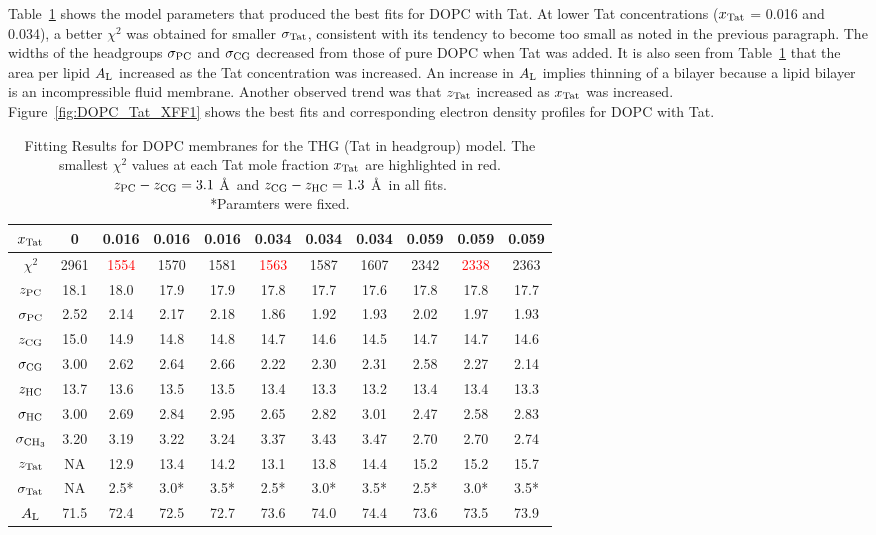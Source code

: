 Table~\ref{tab:DOPC_fit_results} shows the model parameters that produced
the best fits for DOPC with Tat.
At lower Tat concentrations ($x_\textrm{Tat}$ = 0.016 and 0.034), 
a better $\chi^2$ was obtained for smaller $\sigma_\textrm{Tat}$,
consistent with its tendency to become too small as noted 
in the previous paragraph. The widths of the headgroups $\sigma_\textrm{PC}$ and
$\sigma_\textrm{CG}$ decreased from those of pure DOPC when Tat was added.  
It is also seen from Table~\ref{tab:DOPC_fit_results} 
that the area per lipid $A_\textrm{L}$ increased as the Tat concentration was
increased. An increase in $A_\textrm{L}$ implies thinning of a bilayer because
a lipid bilayer is an incompressible fluid membrane. 
Another observed trend was that $z_\textrm{Tat}$ increased as $x_\textrm{Tat}$ was increased.
Figure~\ref{fig:DOPC_Tat_XFF1} shows the best fits and corresponding 
electron density profiles for DOPC with Tat.

\begin{table}[htbp]
  \centering
  \begin{tabular}{c|c|ccc|ccc|ccc}
    \hline
    $x_\textrm{Tat}$ & 0 & 0.016 & 0.016 & 0.016 & 0.034 & 0.034 & 0.034 & 0.059 & 0.059 & 0.059 \\
    \hline
    $\chi^2$ & 2961 & \textcolor{red}{1554} & 1570 & 1581 & \textcolor{red}{1563} & 1587 & 1607 & 2342 & \textcolor{red}{2338} & 2363 \\ 
    $z_\textrm{PC}$ & 18.1 & 18.0 & 17.9 & 17.9 & 17.8 & 17.7 & 17.6 & 17.8 & 17.8 & 17.7 \\
    $\sigma_\textrm{PC}$ & 2.52 & 2.14 & 2.17 & 2.18 & 1.86 & 1.92 & 1.93 & 2.02 & 1.97 & 1.93 \\
    $z_\textrm{CG}$ & 15.0 & 14.9 & 14.8 & 14.8 & 14.7 & 14.6 & 14.5 & 14.7 & 14.7 & 14.6 \\
    $\sigma_\textrm{CG}$ & 3.00 & 2.62 & 2.64 & 2.66 & 2.22 & 2.30 & 2.31 & 2.58 & 2.27 & 2.14 \\
    $z_\textrm{HC}$ & 13.7 & 13.6 & 13.5 & 13.5 & 13.4 & 13.3 & 13.2 & 13.4 & 13.4 & 13.3 \\ 
    $\sigma_\textrm{HC}$ & 3.00 & 2.69 & 2.84 & 2.95 & 2.65 & 2.82 & 3.01 & 2.47 & 2.58 & 2.83 \\
    $\sigma_{\textrm{CH}_3}$ & 3.20 & 3.19 & 3.22 & 3.24 & 3.37 & 3.43 & 3.47 & 2.70 & 2.70 & 2.74 \\
    $z_\textrm{Tat}$ & NA & 12.9 & 13.4 & 14.2 & 13.1 & 13.8 & 14.4 & 15.2 & 15.2 & 15.7 \\
    $\sigma_\textrm{Tat}$ & NA & 2.5* & 3.0* & 3.5* & 2.5* & 3.0* & 3.5* & 2.5* & 3.0* & 3.5* \\ 
    $A_\textrm{L}$ & 71.5 & 72.4 & 72.5 & 72.7 & 73.6 & 74.0 & 74.4 & 73.6 & 73.5 & 73.9 \\
    \hline
  \end{tabular}
  \caption{Fitting Results for DOPC membranes for the THG (Tat in headgroup) model. 
  The smallest $\chi^2$ values at each Tat mole fraction $x_\textrm{Tat}$ are highlighted in red.  
  $z_\textrm{PC}-z_\textrm{CG} = 3.1$ \AA\
  and $z_\textrm{CG}-z_\textrm{HC} = 1.3$ \AA\ in all fits.\\
  *Paramters were fixed.}
  \label{tab:DOPC_fit_results}
\end{table}


